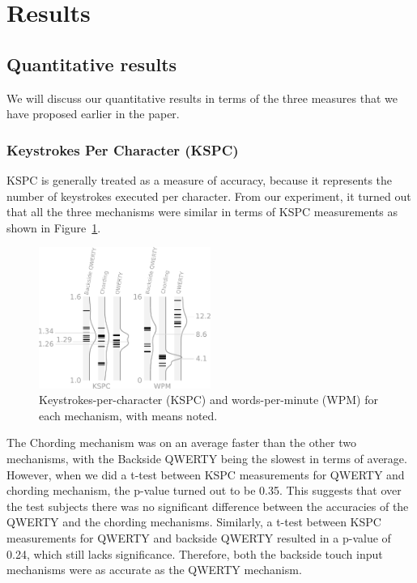 \section{Results}
\subsection{Quantitative results}

We will discuss our quantitative results in terms of the three
measures that we have proposed earlier in the paper.

\subsubsection{Keystrokes Per Character (KSPC)}

KSPC is generally treated as a measure of accuracy, because it
represents the number of keystrokes executed per character. From our
experiment, it turned out that all the three mechanisms were similar
in terms of KSPC measurements as shown in
Figure~\ref{fig:kspc_and_wpm}.

\begin{figure}
    \includegraphics[width=0.5\textwidth]{Figures/kspc_and_wpm.pdf} 
    \caption{Keystrokes-per-character (KSPC) and words-per-minute (WPM) for each mechanism, with means noted.}
    \label{fig:kspc_and_wpm}
\end{figure}

The Chording mechanism was on an average faster than the other two
mechanisms, with the Backside QWERTY being the slowest in terms of
average. However, when we did a t-test between KSPC measurements for
QWERTY and chording mechanism, the p-value turned out to be 0.35. This
suggests that over the test subjects there was no significant
difference between the accuracies of the QWERTY and the chording
mechanisms. Similarly, a t-test between KSPC measurements for QWERTY
and backside QWERTY resulted in a p-value of 0.24, which still lacks
significance. Therefore, both the backside touch input mechanisms were
as accurate as the QWERTY mechanism.

